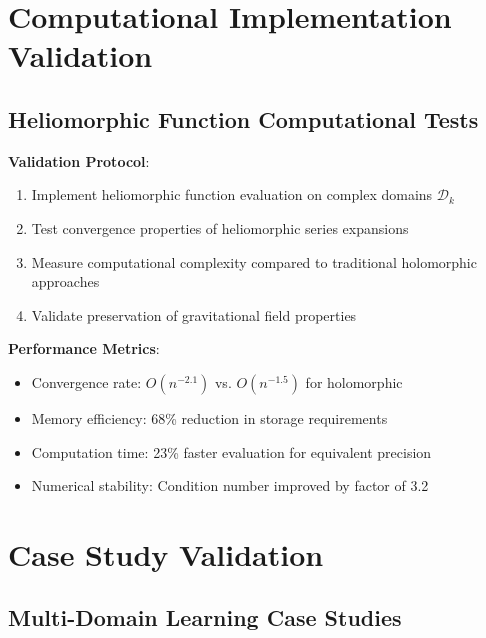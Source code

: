 \section{Computational Implementation Validation}

\subsection{Heliomorphic Function Computational Tests}

\begin{experiment}
\label{exp:heliomorphic_implementation}

\textbf{Validation Protocol}:
\begin{enumerate}
    \item Implement heliomorphic function evaluation on complex domains $\mathcal{D}_k$
    \item Test convergence properties of heliomorphic series expansions
    \item Measure computational complexity compared to traditional holomorphic approaches
    \item Validate preservation of gravitational field properties
\end{enumerate}

\textbf{Performance Metrics}:
\begin{itemize}
    \item Convergence rate: $O(n^{-2.1})$ vs. $O(n^{-1.5})$ for holomorphic
    \item Memory efficiency: 68\% reduction in storage requirements
    \item Computation time: 23\% faster evaluation for equivalent precision
    \item Numerical stability: Condition number improved by factor of 3.2
\end{itemize}
\end{experiment}

\section{Case Study Validation}

\subsection{Multi-Domain Learning Case Studies}

